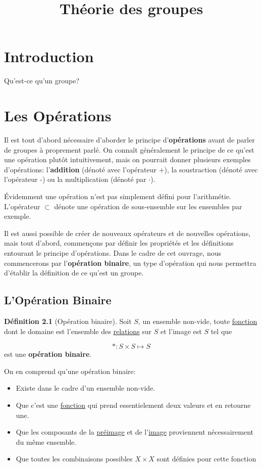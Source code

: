 \documentclass[12pt]{book}
\title{Théorie des groupes}
\theoremstyle{definition}
\newtheorem{definition}{Définition}[section]
\begin{document}
\chapter{Introduction}
Qu'est-ce qu'un groupe?
\chapter{Les Opérations}
Il est tout d'abord nécessaire d'aborder le principe d'\textbf{opérations} avant de parler de groupes à proprement parlé.
On connaît généralement le principe de ce qu'est une opération plutôt intuitivement, mais on pourrait donner plusieurs exemples d'opérations:
l'\textbf{addition} (dénoté avec l'opérateur +), la soustraction (dénoté avec l'opérateur -) ou la multiplication (dénoté par $\cdot$).

Évidemment une opération n'est pas simplement défini pour l'arithmétie. L'opérateur $\subset$ dénote une opération de sous-ensemble sur les ensembles par exemple.

Il est aussi possible de créer de nouveaux opérateurs et de nouvelles opérations, mais tout d'abord, commençons par définir les propriétés et les
définitions entourant le principe d'opérations. Dans le cadre de cet ouvrage, nous commencerons par l'\textbf{opération binaire}, un type
d'opération qui nous permettra d'établir la définition de ce qu'est un groupe.
\section{L'Opération Binaire}

\begin{definition}[Opération binaire]
    \label{def:operation_binaire}
    Soit $S$, un ensemble non-vide, toute \hyperref[def:fonction]{fonction} dont le domaine est l'ensemble des \hyperref[def:relations]{relations} sur $S$ et l'image est $S$ tel que
    
    $$\ast : S \times S \mapsto S$$ est une \textbf{opération binaire}.
\end{definition}

On en comprend qu'une opération binaire:
\begin{itemize}
    \item Existe dans le cadre d'un ensemble non-vide.
    \item Que c'est une \hyperref[def:fonction]{fonction} qui prend essentielement deux valeurs et en retourne une.
    \item Que les composants de la \hyperref[def:pre_image]{préimage} et de l'\hyperref[def:image]{image} proviennent nécessairement du même ensemble.
    \item Que toutes les combinaisons possibles $X \times X$ sont définies pour cette fonction
\end{itemize}
\end{document}
